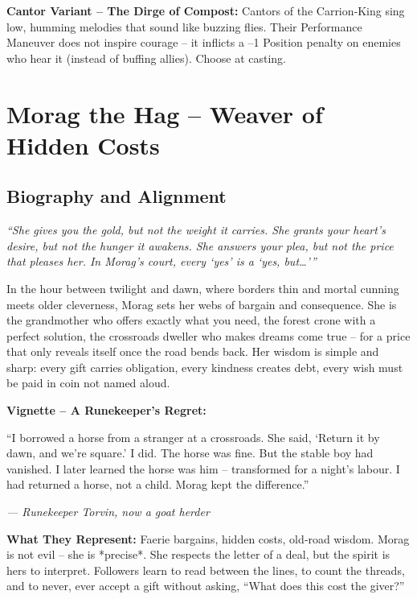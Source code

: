 \documentclass[10pt,a5paper]{book}
\begin{document}
\noindent \textbf{Cantor Variant – The Dirge of Compost:}
Cantors of the Carrion‑King sing low, humming melodies that sound like buzzing flies. Their Performance Maneuver does not inspire courage – it inflicts a –1 Position penalty on enemies who hear it (instead of buffing allies). Choose at casting.

\section{Morag the Hag – Weaver of Hidden Costs}
\label{patron:morag}

\subsection*{Biography and Alignment}

\textit{“She gives you the gold, but not the weight it carries. She grants your heart’s desire, but not the hunger it awakens. She answers your plea, but not the price that pleases her. In Morag’s court, every ‘yes’ is a ‘yes, but…’”}

In the hour between twilight and dawn, where borders thin and mortal cunning meets older cleverness, Morag sets her webs of bargain and consequence. She is the grandmother who offers exactly what you need, the forest crone with a perfect solution, the crossroads dweller who makes dreams come true – for a price that only reveals itself once the road bends back. Her wisdom is simple and sharp: every gift carries obligation, every kindness creates debt, every wish must be paid in coin not named aloud.

\textbf{Vignette – A Runekeeper’s Regret:}
\epigraph{“I borrowed a horse from a stranger at a crossroads. She said, ‘Return it by dawn, and we’re square.’ I did. The horse was fine. But the stable boy had vanished. I later learned the horse was him – transformed for a night’s labour. I had returned a horse, not a child. Morag kept the difference.”}{\textit{— Runekeeper Torvin, now a goat herder}}

\textbf{What They Represent:} Faerie bargains, hidden costs, old‑road wisdom. Morag is not evil – she is *precise*. She respects the letter of a deal, but the spirit is hers to interpret. Followers learn to read between the lines, to count the threads, and to never, ever accept a gift without asking, “What does this cost the giver?”
\end{document}
